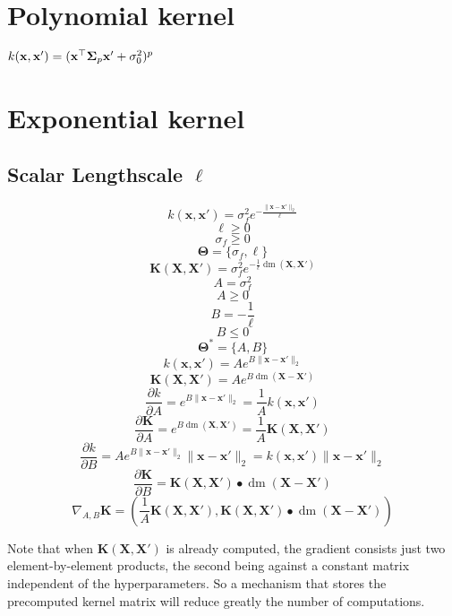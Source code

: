 \documentclass[a4paper,11pt]{article}
\newcommand\x{{\mathbf x}}
\newcommand\X{{\mathbf X}}
\newcommand\K{{\mathbf K}}
\DeclareMathOperator*{\dm}{dm}
\newcommand{\Ivec}[1]{\mbox{\boldmath $#1$}}
\begin{document}
\section{Polynomial kernel}
$k(\x,\x') = (\x^{\top} \Ivec{\Sigma}_p \x' + \sigma_0^2)^p$

\section{Exponential kernel}
\subsection{Scalar Lengthscale $\ell$}
$$k(\x,\x') = \sigma_f^2 e^{-\frac{\|\x-\x'\|_2}{\ell}}$$
$$\ell \ge 0$$
$$\sigma_f \ge 0$$
$$\mathbf{\Theta} = \{ \sigma_f, \ell \}$$
$$\K(\X,\X') = \sigma_f^2 e^{-\frac{1}{\ell}\dm(\X,\X')}$$
$$A = \sigma_f^2$$
$$A \ge 0$$
$$B = -\frac{1}{\ell}$$
$$B \le 0$$
$$\mathbf{\Theta}^* = \{ A, B \}$$
$$k(\x,\x') = A e^{B\|\x-\x'\|_2}$$
$$\K(\X,\X') = A e^{B \dm(\X-\X')}$$
$$\frac{\partial k}{\partial A} = e^{B\|\x-\x'\|_2} = \frac{1}{A}k(\x,\x')$$
$$\frac{\partial \K}{\partial A} = e^{B \dm(\X,\X')} = \frac{1}{A} \K(\X,\X')$$
$$\frac{\partial k}{\partial B} = A e^{B\|\x-\x'\|_2} \|\x-\x'\|_2 =
k(\x,\x') \|\x-\x'\|_2$$
$$\frac{\partial \K}{\partial B} = \K(\X,\X') \bullet \dm(\X-\X')$$
$$\nabla_{A,B} \K = (\frac{1}{A} \K(\X,\X'), \K(\X,\X') \bullet \dm(\X-\X'))$$

Note that when $\K(\X,\X')$ is already computed, the gradient consists
just two element-by-element products, the second being against a
constant matrix independent of the hyperparameters. So a mechanism
that stores the precomputed kernel matrix will reduce greatly the
number of computations.
\end{document}
